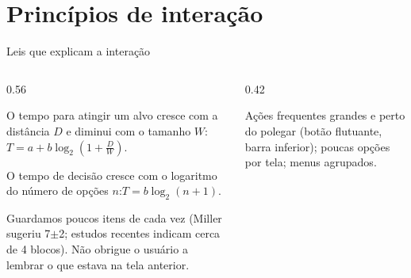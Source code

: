 \documentclass[aspectratio=169,10pt]{beamer}
\begin{document}
\section{Princípios de interação}

\begin{frame}{Leis que explicam a interação}
  \begin{columns}[T]
    \begin{column}{0.56\textwidth}
      \begin{definicao}
        O tempo para atingir um alvo cresce com a distância $D$ e diminui com o tamanho $W$:\quad $T = a + b \log_2\!\left(1 + \frac{D}{W}\right)$.
      \end{definicao}
      \begin{definicao}
        O tempo de decisão cresce com o logaritmo do número de opções $n$:\quad $T = b \log_2(n + 1)$.
      \end{definicao}
      \begin{definicao}
        Guardamos poucos itens de cada vez (Miller sugeriu 7$\pm$2; estudos recentes indicam cerca de 4 blocos). Não obrigue o usuário a lembrar o que estava na tela anterior.
      \end{definicao}
    \end{column}
    \begin{column}{0.42\textwidth}
      \centering
      \begin{conceito}[Consequências]
        Ações frequentes grandes e perto do polegar (botão flutuante, barra inferior); poucas opções por tela; menus agrupados.
      \end{conceito}
    \end{column}
  \end{columns}
\end{frame}
\end{document}
